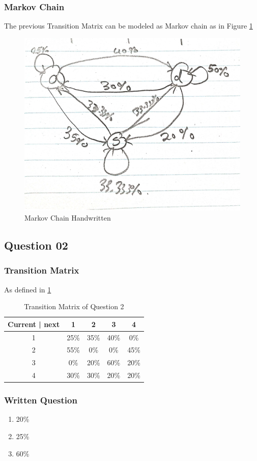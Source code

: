 \documentclass{article}
\begin{document}
\subsubsection{Markov Chain}
The previous Transition Matrix can be modeled as Markov chain as in Figure \ref{q1_markovChain}
\begin{figure}[H]
    \centering
    \includegraphics[width=.5\linewidth]{q1 chain.jpg}
        \caption{Markov Chain Handwritten}

    \label{q1_markovChain}
\end{figure}
\subsection{Question 02}
\subsubsection{Transition Matrix}
As defined in \ref{q2_Transition_matrix}
\begin{table}[h!]
    \centering
    \begin{tabular}{|c | c | c | c| c|}
        \hline
        Current | next & 1 & 2 & 3 & 4\\ 
        \hline
        1 & 25\% & 35\% & 40\% & 0\%\\
        2 & 55\% & 0\% & 0\% & 45\%\\
        3 & 0\% & 20\% & 60\%& 20\% \\
        4 & 30\% & 30\% & 20\% & 20\%\\
        \hline
    \end{tabular}
    \caption{Transition Matrix of Question 2}
    \label{q2_Transition_matrix}
    
\end{table}
\subsubsection{Written Question}
\begin{enumerate}
    \item {20\%}
    \item {25\%}
    \item {60\%}
\end{enumerate}
\end{document}
